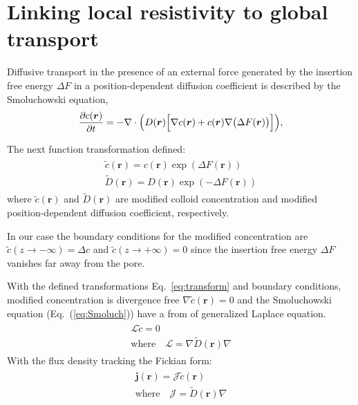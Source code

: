 \documentclass[12pt, a4paper]{article}
\begin{document}
\section{Linking local resistivity to global transport}


Diffusive transport in the presence of an external force generated by the insertion free energy $\Delta F$ in a position-dependent diffusion coefficient is described by the Smoluchowski equation,
\begin{equation}
    \frac{\partial c(\bm{r})}{\partial t}=-\nabla \cdot \Bigl(D(\bm{r}) \Bigl[\nabla c({\bm{r}})+c({\bm{r}})\nabla\bigl(\Delta F(\bm{r})\bigr)\Bigr]\Bigr),
    \label{eq:Smoluch}
\end{equation}

The next function transformation defined:
\begin{eqnarray}
    \begin{gathered}
        \tilde{c}(\bm{r}) = c(\bm{r})\exp(\Delta F(\bm{r}))
        \\
        \tilde{D}(\bm{r}) = D(\bm{r})\exp(-\Delta F(\bm{r})) 
    \end{gathered}
    \label{eq:transform}
\end{eqnarray}
where $\tilde{c}(\bm{r})$ and $\tilde{D}(\bm{r})$ are modified colloid concentration and modified position-dependent diffusion coefficient, respectively.

In our case the boundary conditions for the modified concentration are $\tilde{c}(z\rightarrow -\infty)=\Delta c$ and $\tilde{c}(z\rightarrow +\infty)=0$ since the insertion free energy $\Delta F$ vanishes far away from the pore.

With the defined transformations Eq.~\ref{eq:transform} and boundary conditions, modified concentration is divergence free $\nabla \tilde{c}(\bm{r}) = 0$ and the Smoluchowski equation (Eq.~(\ref{eq:Smoluch})) have a from of generalized Laplace equation.
\begin{eqnarray}
    \begin{gathered}
        \mathcal{L} \tilde{c} = 0\\
        \text{where} \quad \mathcal{L}  = \nabla \tilde{D}(\bm{r}) \nabla 
    \end{gathered}
    \label{eq:laplace}
\end{eqnarray}
With the flux density tracking the Fickian form:
\begin{eqnarray}
    \begin{gathered}
        \bm{j}(\bm{r}) = \mathcal{J} \tilde{c}(\bm{r})\\
        \text{where} \quad \mathcal{J}  = \tilde{D}(\bm{r}) \nabla 
    \end{gathered}
\end{eqnarray}
\end{document}
